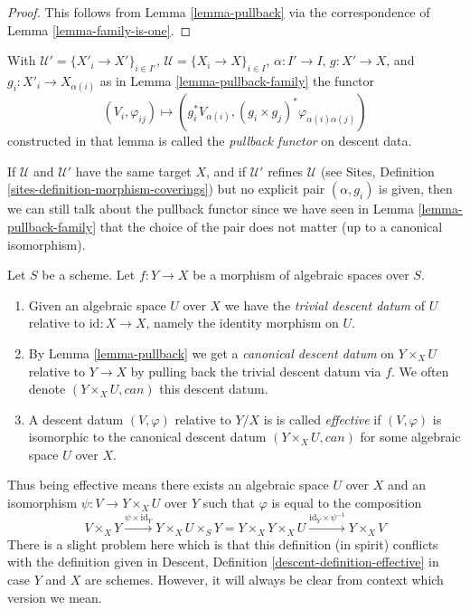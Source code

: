 \begin{proof}
This follows from Lemma \ref{lemma-pullback} via the
correspondence of Lemma \ref{lemma-family-is-one}.
\end{proof}

\begin{definition}
\label{definition-pullback-functor-family}
With $\mathcal{U}' = \{X'_i \to X'\}_{i \in I'}$,
$\mathcal{U} = \{X_i \to X\}_{i \in I}$, $\alpha : I' \to I$,
$g : X' \to X$, and $g_i : X'_i \to X_{\alpha(i)}$ as in
Lemma \ref{lemma-pullback-family} the functor
$$
(V_i, \varphi_{ij}) \longmapsto
(g_i^*V_{\alpha(i)}, (g_i \times g_j)^*\varphi_{\alpha(i) \alpha(j)})
$$
constructed in that lemma
is called the {\it pullback functor} on descent data.
\end{definition}

\noindent
If $\mathcal{U}$ and $\mathcal{U}'$ have the same target $X$,
and if $\mathcal{U}'$ refines $\mathcal{U}$ (see
Sites, Definition \ref{sites-definition-morphism-coverings})
but no explicit pair $(\alpha, g_i)$ is given, then we can still
talk about the pullback functor since we have seen in
Lemma \ref{lemma-pullback-family} that the choice of the pair does not matter
(up to a canonical isomorphism).

\begin{definition}
\label{definition-effective}
Let $S$ be a scheme. Let $f : Y \to X$ be a morphism of algebraic spaces over
$S$.
\begin{enumerate}
\item Given an algebraic space $U$ over $X$ we have the
{\it trivial descent datum} of $U$ relative to $\text{id} : X \to X$, namely
the identity morphism on $U$.
\item By Lemma \ref{lemma-pullback} we get a
{\it canonical descent datum} on $Y \times_X U$
relative to $Y \to X$ by pulling back the trivial
descent datum via $f$. We often
denote $(Y \times_X U, can)$ this descent datum.
\item A descent datum $(V, \varphi)$ relative to $Y/X$ is
is called {\it effective} if $(V, \varphi)$
is isomorphic to the canonical descent datum
$(Y \times_X U, can)$ for some algebraic space $U$ over $X$.
\end{enumerate}
\end{definition}

\noindent
Thus being effective means there exists an algebraic space $U$
over $X$ and an isomorphism $\psi : V \to Y \times_X U$
over $Y$ such that $\varphi$ is equal to the composition
$$
V \times_X Y \xrightarrow{\psi \times \text{id}_Y}
Y \times_X U \times_S Y =
Y \times_X Y \times_X U
\xrightarrow{\text{id}_Y \times \psi^{-1}}
Y \times_X V
$$
There is a slight problem here which is that this definition
(in spirit) conflicts with the definition given in
Descent, Definition \ref{descent-definition-effective}
in case $Y$ and $X$ are schemes. However, it will always be clear from
context which version we mean.

